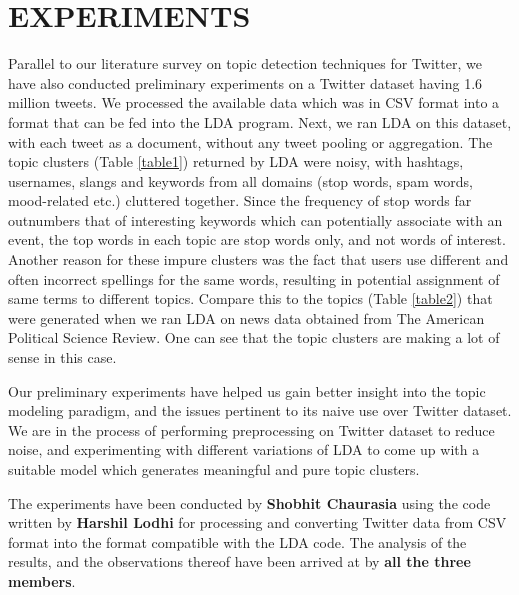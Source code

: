 \section{\uppercase{Experiments}}
Parallel to our literature survey on topic detection techniques for Twitter, we have also conducted preliminary experiments on a Twitter dataset having 1.6 million tweets. We processed the available data which was in CSV format into a format that can be fed into the LDA program. Next, we ran LDA on this dataset, with each tweet as a document, without any tweet pooling or aggregation. The topic clusters (Table \ref{table1}) returned by LDA were noisy, with hashtags, usernames, slangs and keywords from all domains (stop words, spam words, mood-related etc.) cluttered together. Since the frequency of stop words far outnumbers that of interesting keywords which can potentially associate with an event, the top words in each topic are stop words only, and not words of interest. Another reason for these impure clusters was the fact that users use different and often incorrect spellings for the same words, resulting in potential assignment of same terms to different topics. Compare this to the topics (Table \ref{table2}) that were generated when we ran LDA on news data obtained from The American Political Science Review. One can see that the topic clusters are making a lot of sense in this case.

Our preliminary experiments have helped us gain better insight into the topic modeling paradigm, and the issues pertinent to its naive use over Twitter dataset. We are in the process of performing preprocessing on Twitter dataset to reduce noise, and experimenting with different variations of LDA to come up with a suitable model which generates meaningful and pure topic clusters.

The experiments have been conducted by {\bf Shobhit Chaurasia} using the code written by {\bf Harshil Lodhi} for processing and converting Twitter data from CSV format into the format compatible with the LDA code. The analysis of the results, and the observations thereof have been arrived at by {\bf all the three members}.
